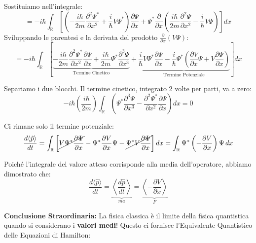 \documentclass[11pt, a4paper]{article}
\begin{document}
Sostituiamo nell'integrale: %
\begin{equation*}
    = -i\hbar \int_{\mathbb{R}} \left[ \left( -\frac{i\hbar}{2m} \frac{\partial^2 \Psi^*}{\partial x^2} + \frac{i}{\hbar} V\Psi^* \right) \frac{\partial \Psi}{\partial x} + \Psi^* \frac{\partial}{\partial x} \left( \frac{i\hbar}{2m} \frac{\partial^2 \Psi}{\partial x^2} - \frac{i}{\hbar} V\Psi \right) \right] dx %
\end{equation*}
Sviluppando le parentesi e la derivata del prodotto $\frac{\partial}{\partial x}(V\Psi)$: %
\begin{equation*}
    = -i\hbar \int_{\mathbb{R}} \left[ \underbrace{ -\frac{i\hbar}{2m} \frac{\partial^2 \Psi^*}{\partial x^2} \frac{\partial \Psi}{\partial x} + \frac{i\hbar}{2m} \Psi^* \frac{\partial^3 \Psi}{\partial x^3} }_{\text{Termine Cinetico}} + \underbrace{ \frac{i}{\hbar} V\Psi^* \frac{\partial \Psi}{\partial x} - \frac{i}{\hbar} \Psi^* \left( \frac{\partial V}{\partial x}\Psi + V\frac{\partial \Psi}{\partial x} \right) }_{\text{Termine Potenziale}} \right] dx %
\end{equation*}

Separiamo i due blocchi. Il termine cinetico, integrato 2 volte per parti, va a zero:
\begin{equation*}
    -i\hbar \left( \frac{i\hbar}{2m} \right) \int_{\mathbb{R}} \left( \Psi^* \frac{\partial^3 \Psi}{\partial x^3} - \frac{\partial^2 \Psi^*}{\partial x^2} \frac{\partial \Psi}{\partial x} \right) dx = 0 %
\end{equation*}

Ci rimane solo il termine potenziale: %
\begin{equation*}
    \frac{d\langle \hat{p} \rangle}{dt} = \int_{\mathbb{R}} \left[ \cancel{V \Psi^* \frac{\partial \Psi}{\partial x}} - \Psi^* \frac{\partial V}{\partial x} \Psi - \cancel{\Psi^* V \frac{\partial \Psi}{\partial x}} \right] dx = \int_{\mathbb{R}} \Psi^* \left( -\frac{\partial V}{\partial x} \right) \Psi \, dx %
\end{equation*}

\noindent
Poiché l'integrale del valore atteso corrisponde alla media dell'operatore, abbiamo dimostrato che: %
\begin{equation}
    \boxed{ \frac{d\langle \hat{p} \rangle}{dt} = \underbrace{\left\langle\frac{d \hat{p} }{dt} \right\rangle}_{ma} = \underbrace{\left\langle -\frac{\partial V}{\partial x} \right\rangle}_{F} } %
\end{equation}

\noindent
\textbf{Conclusione Straordinaria:} %
La fisica classica è il limite della fisica quantistica quando si considerano i \textbf{valori medi}! %
Questo ci fornisce l'Equivalente Quantistico delle Equazioni di Hamilton: %
\end{document}
